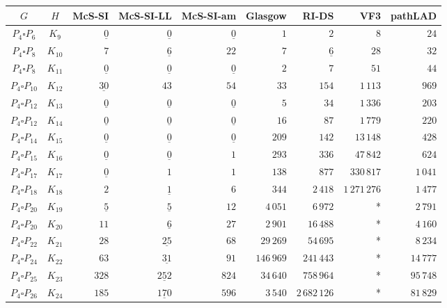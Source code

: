 
\begin{tabular}{ccrrrrrrr}
    \toprule
    {$G$} & {$H$} & {McS-SI} & {McS-SI-LL} & {McS-SI-am} & Glasgow & RI-DS & VF3 & pathLAD \\ 
    \midrule

$P_4\square P_{6}$ & $K_{9}$ & $\underline{0}$ & $\underline{0}$ & $\underline{0}$ & $1$ & $2$ & $8$ & $24$\\
$P_4\square P_{8}$ & $K_{10}$ & $7$ & $\underline{6}$ & $22$ & $7$ & $\underline{6}$ & $28$ & $32$\\
$P_4\square P_{8}$ & $K_{11}$ & $\underline{0}$ & $\underline{0}$ & $\underline{0}$ & $2$ & $7$ & $51$ & $44$\\
$P_4\square P_{10}$ & $K_{12}$ & $\underline{30}$ & $43$ & $54$ & $33$ & $154$ & $1\,113$ & $969$\\
$P_4\square P_{12}$ & $K_{13}$ & $\underline{0}$ & $\underline{0}$ & $\underline{0}$ & $5$ & $34$ & $1\,336$ & $203$\\
$P_4\square P_{12}$ & $K_{14}$ & $\underline{0}$ & $\underline{0}$ & $\underline{0}$ & $16$ & $87$ & $1\,779$ & $220$\\
$P_4\square P_{14}$ & $K_{15}$ & $\underline{0}$ & $\underline{0}$ & $\underline{0}$ & $209$ & $142$ & $13\,148$ & $428$\\
$P_4\square P_{15}$ & $K_{16}$ & $\underline{0}$ & $\underline{0}$ & $1$ & $293$ & $336$ & $47\,842$ & $624$\\
$P_4\square P_{17}$ & $K_{17}$ & $\underline{0}$ & $1$ & $1$ & $138$ & $877$ & $330\,817$ & $1\,041$\\
$P_4\square P_{18}$ & $K_{18}$ & $2$ & $\underline{1}$ & $6$ & $344$ & $2\,418$ & $1\,271\,276$ & $1\,477$\\
$P_4\square P_{20}$ & $K_{19}$ & $\underline{5}$ & $\underline{5}$ & $12$ & $4\,051$ & $6\,972$ & * & $2\,791$\\
$P_4\square P_{20}$ & $K_{20}$ & $11$ & $\underline{6}$ & $27$ & $2\,901$ & $16\,488$ & * & $4\,160$\\
$P_4\square P_{22}$ & $K_{21}$ & $28$ & $\underline{25}$ & $68$ & $29\,269$ & $54\,695$ & * & $8\,234$\\
$P_4\square P_{24}$ & $K_{22}$ & $63$ & $\underline{31}$ & $91$ & $146\,969$ & $241\,443$ & * & $14\,777$\\
$P_4\square P_{25}$ & $K_{23}$ & $328$ & $\underline{252}$ & $824$ & $34\,640$ & $758\,964$ & * & $95\,748$\\
$P_4\square P_{26}$ & $K_{24}$ & $185$ & $\underline{170}$ & $596$ & $3\,540$ & $2\,682\,126$ & * & $81\,829$\\

\end{tabular}
